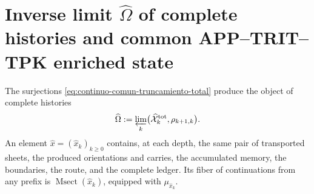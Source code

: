 \section{Inverse limit \(\widehat\Omega\) of complete histories and common APP–TRIT–TPK enriched state}
\label{sec:continuo-comun-limite}

The surjections \eqref{eq:continuo-comun-truncamiento-total} produce the
object of complete histories
\begin{equation}
\label{eq:continuo-comun-omega}
 \widehat\Omega
 :=\varprojlim_k
 \bigl(\widehat{\mathcal X}^{\rm tot}_k,\rho_{k+1,k}\bigr).
\end{equation}
An element \(\widehat x=(\widehat x_k)_{k\geq0}\) contains, at each
depth, the same pair of transported sheets, the produced orientations and
carries, the accumulated memory, the boundaries, the route, and the complete
ledger.  Its fiber of continuations from any prefix is
\(\operatorname{Msect}(\widehat x_k)\), equipped with
\(\mu_{\widehat x_k}\).


